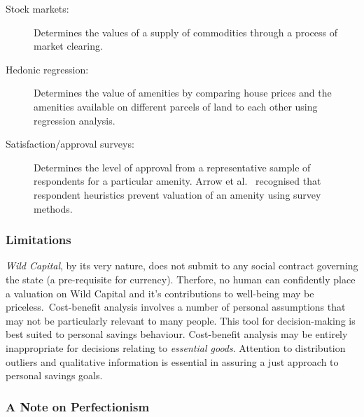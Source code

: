 \documentclass[11pt, oneside]{article}   	%
\begin{document}
\begin{description}
\item[Stock markets:] Determines the values of a supply of commodities through a process of market clearing.
\item[Hedonic regression:] Determines the value of amenities by comparing house prices and the amenities available on different parcels of land to each other using regression analysis.
\item[Satisfaction/approval surveys:] Determines the level of approval from a representative sample of respondents for a particular amenity. Arrow et al.~\cite{kja1} recognised that respondent heuristics prevent valuation of an amenity using survey methods.
\end{description}

\subsubsection{Limitations}

\emph{Wild Capital}, by its very nature, does not submit to any social contract governing the state (a pre-requisite for currency).
Therfore, no human can confidently place a valuation on Wild Capital and it's contributions to well-being may be priceless.\
Cost-benefit analysis involves a number of personal assumptions that may not be particularly relevant to many people. This tool for decision-making is best suited to personal savings behaviour.
Cost-benefit analysis may be entirely inappropriate for decisions relating to \emph{essential goods}.
Attention to distribution outliers and qualitative information is essential in assuring a just approach to personal savings goals.

\subsubsection{A Note on Perfectionism}
\end{document}
